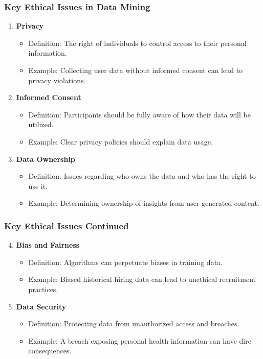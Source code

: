 \documentclass[aspectratio=169]{beamer}
\begin{document}
\begin{frame}[fragile]
    \frametitle{Key Ethical Issues in Data Mining}
    \begin{enumerate}
        \item \textbf{Privacy}
        \begin{itemize}
            \item Definition: The right of individuals to control access to their personal information.
            \item Example: Collecting user data without informed consent can lead to privacy violations.
        \end{itemize}

        \item \textbf{Informed Consent}
        \begin{itemize}
            \item Definition: Participants should be fully aware of how their data will be utilized.
            \item Example: Clear privacy policies should explain data usage.
        \end{itemize}

        \item \textbf{Data Ownership}
        \begin{itemize}
            \item Definition: Issues regarding who owns the data and who has the right to use it.
            \item Example: Determining ownership of insights from user-generated content.
        \end{itemize}
    \end{enumerate}
\end{frame}

\begin{frame}[fragile]
    \frametitle{Key Ethical Issues Continued}
    \begin{enumerate}\setcounter{enumi}{3}
        \item \textbf{Bias and Fairness}
        \begin{itemize}
            \item Definition: Algorithms can perpetuate biases in training data.
            \item Example: Biased historical hiring data can lead to unethical recruitment practices.
        \end{itemize}

        \item \textbf{Data Security}
        \begin{itemize}
            \item Definition: Protecting data from unauthorized access and breaches.
            \item Example: A breach exposing personal health information can have dire consequences.
        \end{itemize}
    \end{enumerate}
\end{frame}
\end{document}
